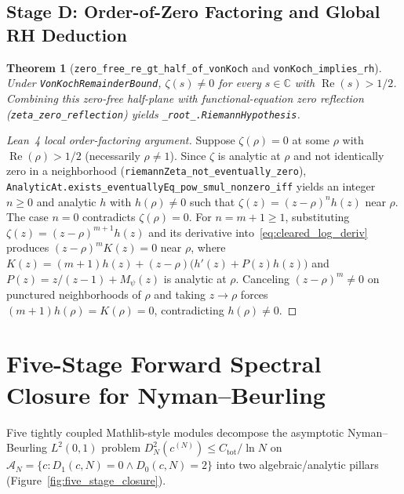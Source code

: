 \documentclass[11pt,a4paper]{article}
\newtheorem{theorem}{Theorem}[section]
\theoremstyle{definition}
\newcommand{\Cfield}{\mathbb{C}}
\begin{document}
\subsection{Stage D: Order-of-Zero Factoring and Global RH Deduction}
\begin{theorem}[\texttt{zero\_\allowbreak free\_\allowbreak re\_\allowbreak gt\_\allowbreak half\_\allowbreak of\_\allowbreak vonKoch} and \texttt{vonKoch\_\allowbreak implies\_\allowbreak rh}]\label{thm:vonkoch}
Under \texttt{VonKochRemainderBound}, $\zeta(s) \neq 0$ for every $s \in \Cfield$ with $\operatorname{Re}(s) > 1/2$. Combining this zero-free half-plane with functional-equation zero reflection (\texttt{zeta\_\allowbreak zero\_\allowbreak reflection}) yields \texttt{\_root\_.\allowbreak RiemannHypothesis}.
\end{theorem}

\begin{proof}[Lean~4 local order-factoring argument]
Suppose $\zeta(\rho) = 0$ at some $\rho$ with $\operatorname{Re}(\rho) > 1/2$ (necessarily $\rho \neq 1$). Since $\zeta$ is analytic at $\rho$ and not identically zero in a neighborhood (\texttt{riemannZeta\_\allowbreak not\_\allowbreak eventually\_\allowbreak zero}), \texttt{AnalyticAt.\allowbreak exists\_\allowbreak eventuallyEq\_\allowbreak pow\_\allowbreak smul\_\allowbreak nonzero\_\allowbreak iff} yields an integer $n \ge 0$ and analytic $h$ with $h(\rho) \neq 0$ such that $\zeta(z) = (z - \rho)^n h(z)$ near $\rho$. The case $n = 0$ contradicts $\zeta(\rho) = 0$. For $n = m + 1 \ge 1$, substituting $\zeta(z) = (z - \rho)^{m+1} h(z)$ and its derivative into~\eqref{eq:cleared_log_deriv} produces $(z - \rho)^m K(z) = 0$ near $\rho$, where $K(z) = (m+1)h(z) + (z - \rho)\big(h'(z) + P(z)h(z)\big)$ and $P(z) = z/(z-1) + M_\psi(z)$ is analytic at $\rho$. Canceling $(z - \rho)^m \neq 0$ on punctured neighborhoods of $\rho$ and taking $z \to \rho$ forces $(m+1)h(\rho) = K(\rho) = 0$, contradicting $h(\rho) \neq 0$.
\end{proof}

\section{Five-Stage Forward Spectral Closure for Nyman--Beurling}\label{sec:five_stage}

Five tightly coupled Mathlib-style modules decompose the asymptotic Nyman--Beurling $L^2(0,1)$ problem $D_N^2(c^{(N)}) \le C_{\mathrm{tot}} / \ln N$ on $\mathcal{A}_N = \{c : D_1(c, N) = 0 \land D_0(c, N) = 2\}$ into two algebraic/analytic pillars (Figure~\ref{fig:five_stage_closure}).
\end{document}
